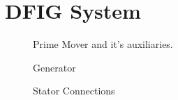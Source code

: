 \documentclass{beamer}
\begin{document}
\section{DFIG System}

\begin{frame}{}
       \begin{figure}
        \centering
        \caption{Prime Mover and it's auxiliaries.}
    \end{figure}
\end{frame}

\begin{frame}{}
       \begin{figure}
        \centering
        \caption{Generator}
    \end{figure}
\end{frame}

\begin{frame}{}
       \begin{figure}
        \centering
        \caption{Stator Connections}
    \end{figure}
\end{frame}
\end{document}
